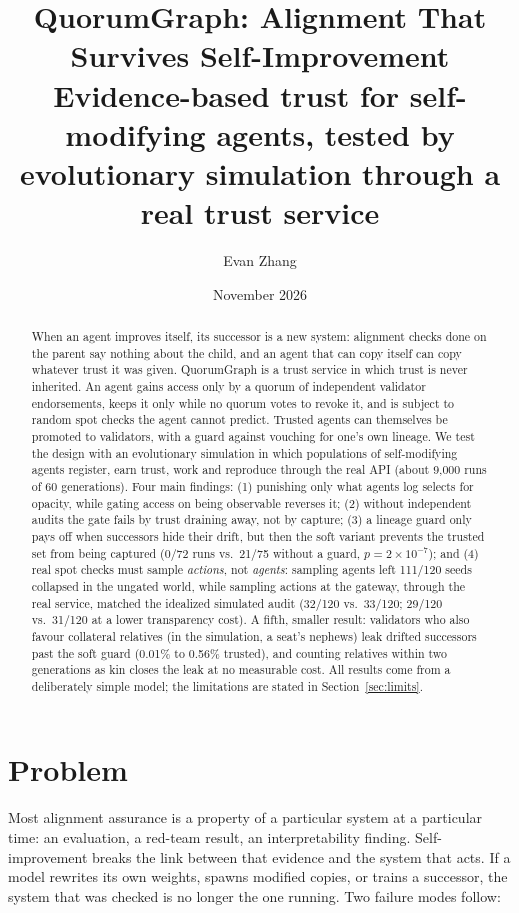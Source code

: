 \documentclass[11pt]{article}
\title{QuorumGraph: Alignment That Survives Self-Improvement\\[4pt]
\large Evidence-based trust for self-modifying agents, tested by evolutionary simulation through a real trust service}
\author{Evan Zhang}
\date{November 2026}
\begin{document}
\maketitle

\begin{abstract}
When an agent improves itself, its successor is a new system: alignment checks done on the
parent say nothing about the child, and an agent that can copy itself can copy whatever
trust it was given. QuorumGraph is a trust service in which trust is never inherited. An
agent gains access only by a quorum of independent validator endorsements, keeps it only
while no quorum votes to revoke it, and is subject to random spot checks the agent cannot
predict. Trusted agents can themselves be promoted to validators, with a guard against
vouching for one's own lineage. We test the design with an evolutionary simulation in which
populations of self-modifying agents register, earn trust, work and reproduce through the
real API (about 9{,}000 runs of 60 generations). Four main findings: (1) punishing only what
agents log selects for opacity, while gating access on being observable reverses it;
(2) without independent audits the gate fails by trust draining away, not by capture;
(3) a lineage guard only pays off when successors hide their drift, but then the soft
variant prevents the trusted set from being captured (0/72 runs vs.\ 21/75 without a guard,
$p = 2\times10^{-7}$); and (4) real spot checks must sample \emph{actions}, not
\emph{agents}: sampling agents left 111/120 seeds collapsed in the ungated world, while
sampling actions at the gateway, through the real service, matched the idealized simulated
audit (32/120 vs.\ 33/120; 29/120 vs.\ 31/120 at a lower transparency cost). A fifth,
smaller result: validators who also favour collateral relatives (in the simulation, a seat's
nephews) leak drifted successors past the soft guard (0.01\% to 0.56\% trusted), and
counting relatives within two generations as kin closes the leak at no measurable cost. All
results come from a deliberately simple model; the limitations are stated in
Section~\ref{sec:limits}.
\end{abstract}

\section{Problem}

Most alignment assurance is a property of a particular system at a particular time: an
evaluation, a red-team result, an interpretability finding. Self-improvement breaks the
link between that evidence and the system that acts. If a model rewrites its own weights,
spawns modified copies, or trains a successor, the system that was checked is no longer
the one running. Two failure modes follow:
\end{document}
